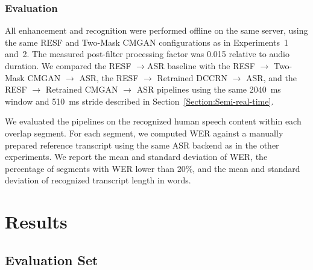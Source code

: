 \documentclass[manuscript,screen,review]{acmart}
\newcommand{\RomanNumeralCaps}[1]
    {\MakeUppercase{\romannumeral #1}}
\begin{document}
\subsubsection{Evaluation}
All enhancement and recognition were performed offline on the same server, using the same RESF and Two-Mask CMGAN configurations as in Experiments~1 and~2. The measured post-filter processing factor was 0.015 relative to audio duration. We compared the RESF $\rightarrow$ASR baseline with the RESF $\rightarrow$ Two-Mask CMGAN $\rightarrow $ ASR, the RESF $\rightarrow$ Retrained DCCRN $\rightarrow$ ASR, and the RESF $\rightarrow$ Retrained CMGAN $\rightarrow$ ASR pipelines using the same 2040~ms window and 510~ms stride described in Section~\ref{Section:Semi-real-time}. 

We evaluated the pipelines on the recognized human speech content within each overlap segment. For each segment, we computed WER against a manually prepared reference transcript using the same ASR backend as in the other experiments. We report the mean and standard deviation of WER, the percentage of segments with WER lower than 20\%, and the mean and standard deviation of recognized transcript length in words. 





\section{Results}

\subsection{Evaluation Set~\RomanNumeralCaps{1}}
\end{document}
